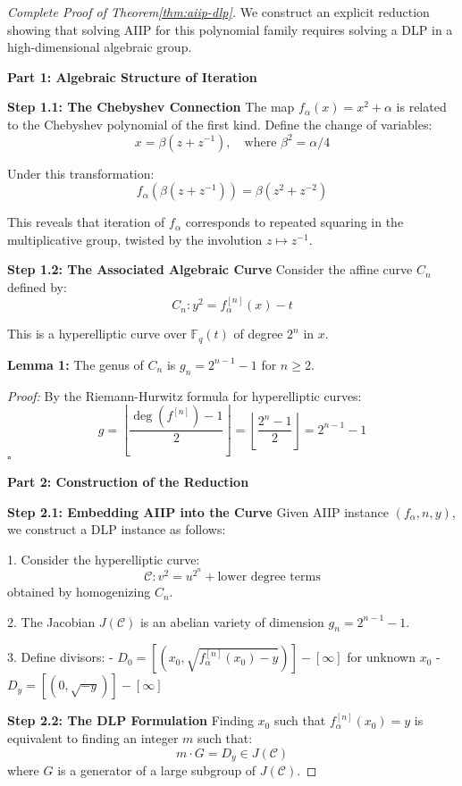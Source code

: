 \begin{proof}[Complete Proof of Theorem\ref{thm:aiip-dlp}]
We construct an explicit reduction showing that solving AIIP for this polynomial family requires solving a DLP in a high-dimensional algebraic group.

\textbf{Part 1: Algebraic Structure of Iteration}

    \textbf{Step 1.1: The Chebyshev Connection}
    The map $f_\alpha(x) = x^2 + \alpha$ is related to the Chebyshev polynomial of the 
    first kind. Define the change of variables:
    $$x = \beta(z + z^{-1}), \quad \text{where } \beta^2 = \alpha/4$$

    Under this transformation:
    $$f_\alpha(\beta(z + z^{-1})) = \beta(z^2 + z^{-2})$$

    This reveals that iteration of $f_\alpha$ corresponds to repeated squaring in the 
    multiplicative group, twisted by the involution $z \mapsto z^{-1}$.

    \textbf{Step 1.2: The Associated Algebraic Curve}
    Consider the affine curve $C_n$ defined by:
    $$C_n: y^2 = f_\alpha^{[n]}(x) - t$$

    This is a hyperelliptic curve over $\mathbb{F}_q(t)$ of degree $2^n$ in $x$.

    \textbf{Lemma 1:} The genus of $C_n$ is $g_n = 2^{n-1} - 1$ for $n \geq 2$.

    \textit{Proof:} By the Riemann-Hurwitz formula for hyperelliptic curves:
    $$g = \left\lfloor \frac{\deg(f^{[n]}) - 1}{2} \right\rfloor = 
    \left\lfloor \frac{2^n - 1}{2} \right\rfloor = 2^{n-1} - 1$$
    $\square$

\textbf{Part 2: Construction of the Reduction}

    \textbf{Step 2.1: Embedding AIIP into the Curve}
    Given AIIP instance $(f_\alpha, n, y)$, we construct a DLP instance as follows:

    1. Consider the hyperelliptic curve:
    $$\mathcal{C}: v^2 = u^{2^n} + \text{lower degree terms}$$
    obtained by homogenizing $C_n$.

    2. The Jacobian $J(\mathcal{C})$ is an abelian variety of dimension $g_n = 2^{n-1} - 1$.

    3. Define divisors:
    - $D_0 = [(x_0, \sqrt{f_\alpha^{[n]}(x_0) - y})] - [\infty]$ for unknown $x_0$
    - $D_y = [(0, \sqrt{-y})] - [\infty]$

    \textbf{Step 2.2: The DLP Formulation}
    Finding $x_0$ such that $f_\alpha^{[n]}(x_0) = y$ is equivalent to finding an integer 
    $m$ such that:
    $$m \cdot G = D_y \in J(\mathcal{C})$$
    where $G$ is a generator of a large subgroup of $J(\mathcal{C})$.


\end{proof}
